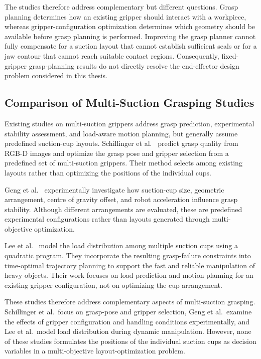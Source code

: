 The studies therefore address complementary but different questions. Grasp planning determines how an existing gripper should interact with a
workpiece, whereas gripper-configuration optimization determines which geometry should be available before grasp planning is performed. Improving the
grasp planner cannot fully compensate for a suction layout that cannot establish sufficient seals or for a jaw contour that cannot reach suitable
contact regions. Consequently, fixed-gripper grasp-planning results do not directly resolve the end-effector design problem considered in this thesis.

\subsection{Comparison of Multi-Suction Grasping Studies}

Existing studies on multi-suction grippers address grasp prediction, experimental stability assessment, and load-aware motion planning, but generally
assume predefined suction-cup layouts. Schillinger et al.\ \cite{Schillinger2023Model-Free} predict grasp quality from RGB-D images and optimize the
grasp pose and gripper selection from a predefined set of multi-suction grippers. Their method selects among existing layouts rather than optimizing
the positions of the individual cups.

Geng et al.\ \cite{Geng2025Experimental} experimentally investigate how suction-cup size, geometric arrangement, centre of gravity offset, and robot
acceleration influence grasp stability. Although different arrangements are evaluated, these are predefined experimental configurations rather than
layouts generated through multi-objective optimization.

Lee et al.\ \cite{Lee2024Grasp} model the load distribution among multiple suction cups using a quadratic program. They incorporate the resulting
grasp-failure constraints into time-optimal trajectory planning to support the fast and reliable manipulation of heavy objects. Their work focuses on
load prediction and motion planning for an existing gripper configuration, not on optimizing the cup arrangement.

These studies therefore address complementary aspects of multi-suction grasping. Schillinger et al.\ focus on grasp-pose and gripper selection, Geng
et al.\ examine the effects of gripper configuration and handling conditions experimentally, and Lee et al.\ model load distribution during dynamic
manipulation. However, none of these studies formulates the positions of the individual suction cups as decision variables in a multi-objective
layout-optimization problem.

